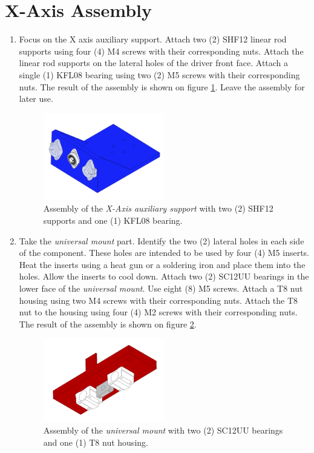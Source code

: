 \documentclass{article}
\begin{document}
\section{X-Axis Assembly}
\begin{enumerate}

    \item Focus on the X axis auxiliary support. Attach two (2) SHF12 linear rod supports using four (4) M4 screws with their corresponding nuts. Attach the linear rod supports on the lateral holes of the driver front face. Attach a single (1) KFL08 bearing using two (2) M5 screws with their corresponding nuts. The result of the assembly is shown on figure \ref{fig:xa_step_1}. Leave the assembly for later use.
    
    \begin{figure}[H]
        \centering
        \includegraphics[width=0.5\textwidth]{images/x_axis/step_A.png}
        \caption{Assembly of the \textit{X-Axis auxiliary support} with two (2) SHF12 supports and one (1) KFL08 bearing.}
        \label{fig:xa_step_1}
    \end{figure}
    
    \item Take the \textit{universal mount} part. Identify the two (2) lateral holes in each side of the component. These holes are intended to be used by four (4) M5 inserts. Heat the inserts using a heat gun or a soldering iron and place them into the holes. Allow the inserts to cool down. Attach two (2) SC12UU bearings in the lower face of the \textit{universal mount}. Use eight (8) M5 screws. Attach a T8 nut housing using two M4 screws with their corresponding nuts. Attach the T8 nut to the housing using four (4) M2 screws with their corresponding nuts. The result of the assembly is shown on figure \ref{fig:xa_step_2}.
    
    \begin{figure}[H]
        \centering
        \includegraphics[width=0.5\textwidth]{images/x_axis/step_B.png}
        \caption{Assembly of the \textit{universal mount} with two (2) SC12UU bearings and one (1) T8 nut housing.}
        \label{fig:xa_step_2}
    \end{figure}
    

\end{enumerate}
\end{document}
